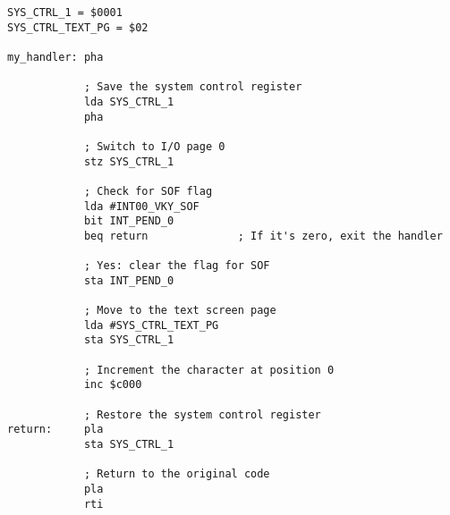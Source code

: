 \begin{verbatim}
SYS_CTRL_1 = $0001
SYS_CTRL_TEXT_PG = $02

my_handler: pha

            ; Save the system control register
            lda SYS_CTRL_1
            pha

            ; Switch to I/O page 0
            stz SYS_CTRL_1

            ; Check for SOF flag
            lda #INT00_VKY_SOF
            bit INT_PEND_0
            beq return              ; If it's zero, exit the handler

            ; Yes: clear the flag for SOF
            sta INT_PEND_0

            ; Move to the text screen page
            lda #SYS_CTRL_TEXT_PG
            sta SYS_CTRL_1

            ; Increment the character at position 0
            inc $c000

            ; Restore the system control register
return:     pla
            sta SYS_CTRL_1

            ; Return to the original code
            pla
            rti
\end{verbatim}
